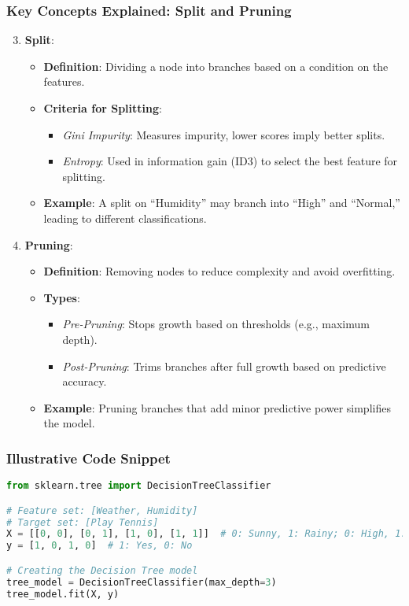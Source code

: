 \documentclass[aspectratio=169]{beamer}
\begin{document}
\begin{frame}
    \frametitle{Key Concepts Explained: Split and Pruning}
    \begin{enumerate}
        \setcounter{enumi}{2}
        \item \textbf{Split}:
        \begin{itemize}
            \item \textbf{Definition}: Dividing a node into branches based on a condition on the features.
            \item \textbf{Criteria for Splitting}:
            \begin{itemize}
                \item \textit{Gini Impurity}: Measures impurity, lower scores imply better splits.
                \item \textit{Entropy}: Used in information gain (ID3) to select the best feature for splitting.
            \end{itemize}
            \item \textbf{Example}: A split on “Humidity” may branch into “High” and “Normal,” leading to different classifications.
        \end{itemize}

        \item \textbf{Pruning}:
        \begin{itemize}
            \item \textbf{Definition}: Removing nodes to reduce complexity and avoid overfitting.
            \item \textbf{Types}:
            \begin{itemize}
                \item \textit{Pre-Pruning}: Stops growth based on thresholds (e.g., maximum depth).
                \item \textit{Post-Pruning}: Trims branches after full growth based on predictive accuracy.
            \end{itemize}
            \item \textbf{Example}: Pruning branches that add minor predictive power simplifies the model.
        \end{itemize}
    \end{enumerate}
\end{frame}

\begin{frame}[fragile]
    \frametitle{Illustrative Code Snippet}
    \begin{lstlisting}[language=Python]
from sklearn.tree import DecisionTreeClassifier

# Feature set: [Weather, Humidity]
# Target set: [Play Tennis]
X = [[0, 0], [0, 1], [1, 0], [1, 1]]  # 0: Sunny, 1: Rainy; 0: High, 1: Normal
y = [1, 0, 1, 0]  # 1: Yes, 0: No

# Creating the Decision Tree model
tree_model = DecisionTreeClassifier(max_depth=3)
tree_model.fit(X, y)
    \end{lstlisting}
\end{frame}
\end{document}
